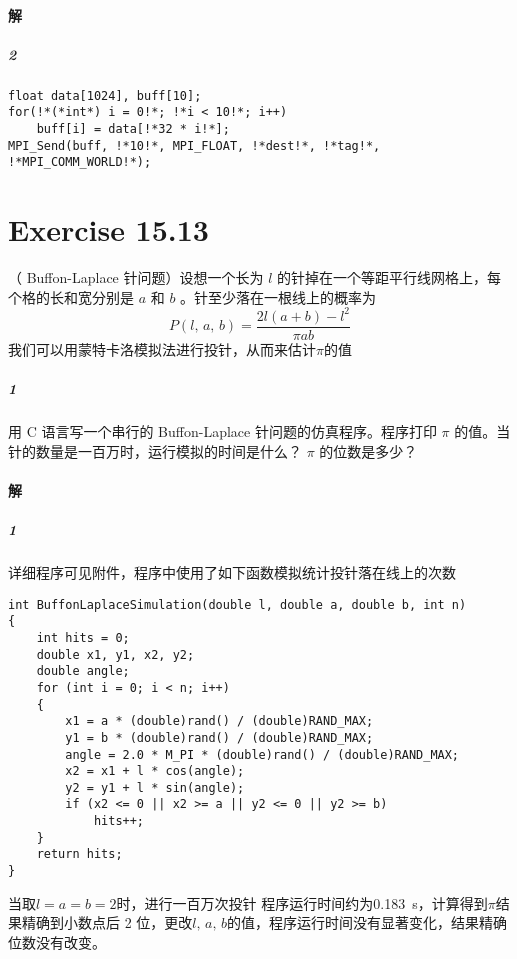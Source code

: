 \documentclass{article}
\begin{document}
\paragraph{解}
\subparagraph{\textcircled{2}}
\begin{lstlisting}[xleftmargin = .1\textwidth, xrightmargin = .1\textwidth]
float data[1024], buff[10];
for(!*(*int*) i = 0!*; !*i < 10!*; i++)
    buff[i] = data[!*32 * i!*];
MPI_Send(buff, !*10!*, MPI_FLOAT, !*dest!*, !*tag!*, !*MPI_COMM_WORLD!*);
\end{lstlisting}

\section{Exercise 15.13}
（ Buffon-Laplace 针问题）设想一个长为 $l$ 的针掉在一个等距平行线网格上，每个格的长和宽分别是 $a$ 和 $b$ 。针至少落在一根线上的概率为
$$
    P(l,\,a,\,b) = \frac{2l(a + b) - l^2}{\pi a b}
$$
我们可以用蒙特卡洛模拟法进行投针，从而来估计$\pi$的值
\subparagraph{\textcircled{1}} 用 C 语言写一个串行的 Buffon-Laplace 针问题的仿真程序。程序打印 $\pi$ 的值。当针的数量是一百万时，运行模拟的时间是什么？ $\pi$ 的位数是多少？

\paragraph{解}
\subparagraph{\textcircled{1}}
详细程序可见附件，程序中使用了如下函数模拟统计投针落在线上的次数
\begin{lstlisting}[xleftmargin = .1\textwidth, xrightmargin = .1\textwidth, frame = single]
int BuffonLaplaceSimulation(double l, double a, double b, int n)
{
    int hits = 0;
    double x1, y1, x2, y2;
    double angle;
    for (int i = 0; i < n; i++)
    {
        x1 = a * (double)rand() / (double)RAND_MAX;
        y1 = b * (double)rand() / (double)RAND_MAX;
        angle = 2.0 * M_PI * (double)rand() / (double)RAND_MAX;
        x2 = x1 + l * cos(angle);
        y2 = y1 + l * sin(angle);
        if (x2 <= 0 || x2 >= a || y2 <= 0 || y2 >= b)
            hits++;
    }
    return hits;
}
\end{lstlisting}
当取$l = a = b = 2$时，进行一百万次投针
程序运行时间约为\SI{0.183}{\second}，计算得到$\pi$结果精确到小数点后 2 位，更改$l,\,a,\,b$的值，程序运行时间没有显著变化，结果精确位数没有改变。
\end{document}
